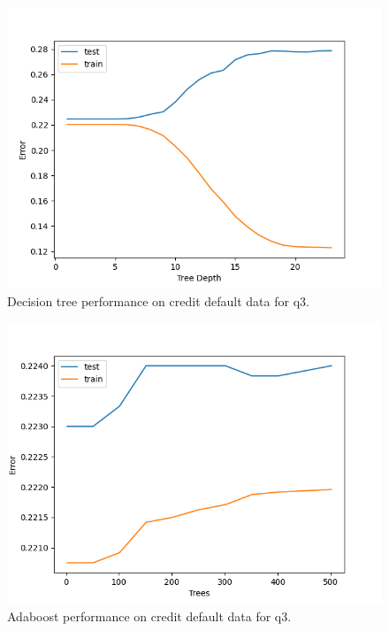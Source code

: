 \documentclass[12pt, fullpage,letterpaper]{article}
\begin{document}
\begin{enumerate}
\begin{figure}[htp]
    \centering
    \includegraphics[width=12cm]{q3_decision_tree_plot.png}
    \caption{Decision tree performance on credit default data for q3.}
    \label{fig:q4a}
\end{figure}

\begin{figure}[htp]
    \centering
    \includegraphics[width=12cm]{q3_adaboost_plot.png}
    \caption{Adaboost performance on credit default data for q3.}
    \label{fig:q4a}
\end{figure}


\end{enumerate}
\end{document}
